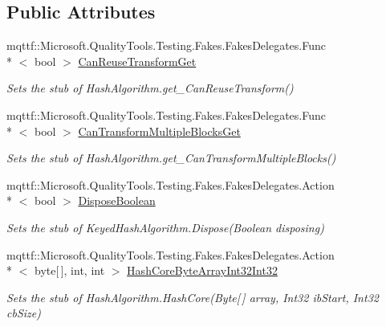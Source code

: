 \subsection*{Public Attributes}
\begin{DoxyCompactItemize}
\item 
mqttf\-::\-Microsoft.\-Quality\-Tools.\-Testing.\-Fakes.\-Fakes\-Delegates.\-Func\\*
$<$ bool $>$ \hyperlink{class_system_1_1_security_1_1_cryptography_1_1_fakes_1_1_stub_keyed_hash_algorithm_aee493d7b2721b6fae25b9339700c182e}{Can\-Reuse\-Transform\-Get}
\begin{DoxyCompactList}\small\item\em Sets the stub of Hash\-Algorithm.\-get\-\_\-\-Can\-Reuse\-Transform()\end{DoxyCompactList}\item 
mqttf\-::\-Microsoft.\-Quality\-Tools.\-Testing.\-Fakes.\-Fakes\-Delegates.\-Func\\*
$<$ bool $>$ \hyperlink{class_system_1_1_security_1_1_cryptography_1_1_fakes_1_1_stub_keyed_hash_algorithm_abd3f3ff2dac0501f07f65793c43db69b}{Can\-Transform\-Multiple\-Blocks\-Get}
\begin{DoxyCompactList}\small\item\em Sets the stub of Hash\-Algorithm.\-get\-\_\-\-Can\-Transform\-Multiple\-Blocks()\end{DoxyCompactList}\item 
mqttf\-::\-Microsoft.\-Quality\-Tools.\-Testing.\-Fakes.\-Fakes\-Delegates.\-Action\\*
$<$ bool $>$ \hyperlink{class_system_1_1_security_1_1_cryptography_1_1_fakes_1_1_stub_keyed_hash_algorithm_a0e6d0b5484c82c2fc55a56274926bbe5}{Dispose\-Boolean}
\begin{DoxyCompactList}\small\item\em Sets the stub of Keyed\-Hash\-Algorithm.\-Dispose(\-Boolean disposing)\end{DoxyCompactList}\item 
mqttf\-::\-Microsoft.\-Quality\-Tools.\-Testing.\-Fakes.\-Fakes\-Delegates.\-Action\\*
$<$ byte\mbox{[}$\,$\mbox{]}, int, int $>$ \hyperlink{class_system_1_1_security_1_1_cryptography_1_1_fakes_1_1_stub_keyed_hash_algorithm_a503f7c352ef87918ae0571bcc1a13c52}{Hash\-Core\-Byte\-Array\-Int32\-Int32}
\begin{DoxyCompactList}\small\item\em Sets the stub of Hash\-Algorithm.\-Hash\-Core(\-Byte\mbox{[}$\,$\mbox{]} array, Int32 ib\-Start, Int32 cb\-Size)\end{DoxyCompactList}\item 

\end{DoxyCompactItemize}
